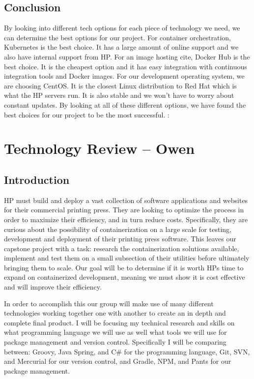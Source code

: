 \documentclass[onecolumn, draftclsnofoot,10pt, compsoc]{IEEEtran}
\begin{document}
\subsection{Conclusion}
By looking into different tech options for each piece of technology we need, we can determine the best options for our project. For container orchestration, Kubernetes is the best choice. It has a large amount of online support and we also have internal support from HP. For an image hosting cite, Docker Hub is the best choice. It is the cheapest option and it has easy integration with continuous integration tools and Docker images. For our development operating system, we are choosing CentOS. It is the closest Linux distribution to Red Hat which is what the HP servers run. It is also stable and we won't have to worry about constant updates. By looking at all of these different options, we have found the best choices for our project to be the most successful. :



\section{Technology Review -- Owen}
\subsection{Introduction}
    HP must build and deploy a vast collection of software applications and websites for their commercial printing press. They are looking to optimize the process in order to maximize their efficiency, and in turn reduce costs. Specifically, they are curious about the possibility of containerization on a large scale for testing, development and deployment of their printing press software. This leaves our capstone project with a task: research the containerization solutions available, implement and test them on a small subsection of their utilities before ultimately bringing them to scale. Our goal will be to determine if it is worth HPs time to expand on containerized development, meaning we must show it is cost effective and will improve their efficiency.

    In order to accomplish this our group will make use of many different technologies working together one with another to create an in depth and complete final product. I will be focusing my technical research and skills on what programming language we will use as well what tools we will use for package management and version control. Specifically I will be comparing between: Groovy, Java Spring, and C\# for the programming language, Git, SVN, and Mercurial for our version control, and Gradle, NPM, and Pants for our package management.
\end{document}
